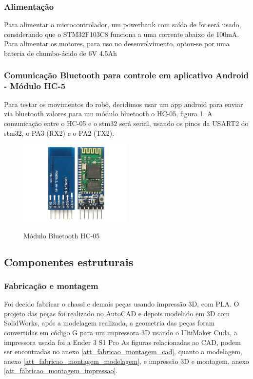 \subsubsection{Alimentação}
Para alimentar o microcontrolador, um powerbank com saída de 5v será usado, considerando que o STM32F103C8 funciona a
uma corrente abaixo de 100mA. Para alimentar os motores, para uso no desenvolvimento, optou-se por uma bateria de chumbo-ácido de 6V 4.5Ah

\subsubsection{Comunicação Bluetooth para controle em aplicativo Android - Módulo HC-5}
Para testar os movimentos do robô, decidimos usar um app android para enviar via bluetooth valores para um módulo bluetooth o HC-05, figura \ref{fig:hc_05}.
A comunicação entre o HC-05 e o stm32 será serial, usando os pinos da USART2 do stm32, o PA3 (RX2) e o PA2 (TX2).

\begin{figure}[htb]
	\centering
	\includegraphics[width=0.5\textwidth]{figures/hc_05}
	\caption{Módulo Bluetooth HC-05}
	\label{fig:hc_05}
	\cite{hc05_image}
\end{figure}

\subsection{Componentes estruturais}

\subsubsection{Fabricação e montagem}
Foi decido fabricar o chassi e demais peças usando impressão 3D, com PLA.
O projeto das peças foi realizado no AutoCAD e depois modelado em 3D com SolidWorks, após a modelagem realizada,
a geometria das peças foram convertidas em código G para um impressora 3D usando o UltiMaker Cuda, a impressora usada foi a Ender 3 S1 Pro
As figuras relacionadas ao CAD, podem ser encontradas no anexo \ref{att_fabricao_montagem_cad}, quanto a modelagem,
anexo \ref{att_fabricao_montagem_modelagem}, e impressão 3D e montagem, anexo \ref{att_fabricao_montagem_impressao}.

